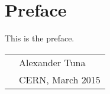 
\chapter*{Preface}

This is the preface.

\vspace{0.05\textheight}

\begin{tabular}{p{} l}
  & Alexander Tuna   \\
  & CERN, March 2015 \\
\end{tabular}

